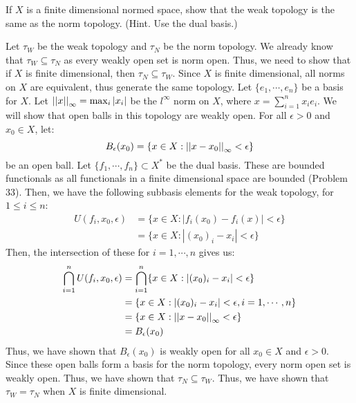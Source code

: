 \documentclass[12pt]{article}
\begin{document}
\begin{problem}{45}
    If $X$ is a finite dimensional normed space, show that the weak topology is the same as the norm topology. (Hint. Use the dual basis.)
\end{problem}
\begin{solution}
    Let $\tau_W$ be the weak topology and $\tau_N$ be the norm topology. We already know that $\tau_W \subseteq \tau_N$ as every weakly open set is norm open. Thus, we need to show that if $X$ is finite dimensional, then $\tau_N \subseteq \tau_W$. \bbni
    Since $X$ is finite dimensional, all norms on $X$ are equivalent, thus generate the same topology. Let $\{e_1, \cdots, e_n\}$ be a basis for $X$. Let $\left\vert\left\vert x\right\vert\right\vert_\infty =  \max_i |x_i|$ be the $l^\infty$ norm on $X$, where $x = \sum_{i=1}^n x_ie_i$. We will show that open balls in this topology are weakly open. \bbni 
    For all $\epsilon > 0$ and $x_0 \in X$, let:
    \[B_\epsilon(x_0) = \{ x \in X : \left\vert\left\vert x-x_0\right\vert\right\vert_\infty < \epsilon\}\]
    be an open ball. Let $\{f_1, \cdots, f_n\} \subset X^*$ be the dual basis. These are bounded functionals as all functionals in a finite dimensional space are bounded (Problem 33). Then, we have the following subbasis elements for the weak topology, for $1 \leq i \leq n$:
    \begin{align*}
        U(f_i, x_0, \epsilon) &= \{ x \in X: |f_i(x_0)-f_i(x)| < \epsilon\}\\
        &= \{ x \in X: |(x_0)_i - x_i| < \epsilon\}
    \end{align*}
    Then, the intersection of these for $i = 1, \cdots, n$ gives us:
    \begin{align*}
        \bigcap_{i=1}^n U(f_i, x_0, \epsilon) &= \bigcap_{i=1}^n \{ x \in X: |(x_0)_i - x_i| < \epsilon\} \\
        &=  \{ x \in X: |(x_0)_i - x_i| < \epsilon , i = 1, \cdots, n\} \\
        &= \{ x \in X: \left\vert\left\vert x-x_0\right\vert\right\vert_\infty < \epsilon\} \\
        &= B_\epsilon(x_0)
    \end{align*}
    Thus, we have shown that $B_\epsilon(x_0)$ is weakly open for all $x_0 \in X$ and $\epsilon > 0$. Since these open balls form a basis for the norm topology, every norm open set is weakly open. Thus, we have shown that $\tau_N \subseteq \tau_W$.    \bbni
    Thus, we have shown that $\tau_W = \tau_N$ when $X$ is finite dimensional.
\end{solution}
\newpage
\end{document}
